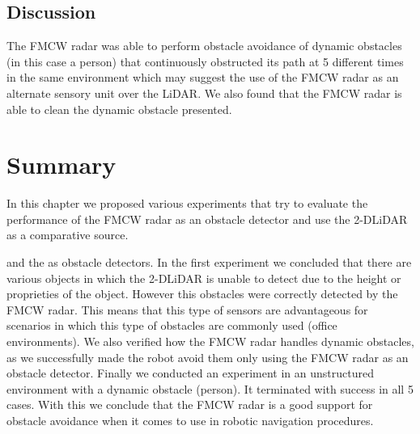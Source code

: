 \subsection{Discussion}
 The \ac{FMCW} radar was able to perform 
obstacle avoidance of dynamic obstacles (in this case a person) that continuously obstructed its path at 5 different times in the same environment which may suggest the use of the \ac{FMCW} \ac{radar} as an alternate sensory unit over the \ac{LiDAR}. We also found that the \ac{FMCW} \ac{radar} is able to clean the dynamic obstacle presented.

\section{Summary}
In this chapter we proposed various experiments that try to evaluate the performance of the \ac{FMCW} \ac{radar} as an obstacle detector and use the 2-D\ac{LiDAR} as a comparative source. 

and the  as obstacle detectors. In the first experiment we concluded that there are various objects in which the 2-D\ac{LiDAR} is unable to detect due to the height or proprieties of the object. However this obstacles were correctly detected by the \ac{FMCW} \ac{radar}. This means that this type of sensors  are advantageous for scenarios in which this type of obstacles are commonly used (office environments). We also verified how the FMCW radar handles dynamic obstacles, as we successfully made the robot avoid them only using the \ac{FMCW} \ac{radar} as an obstacle detector. Finally we conducted an experiment in an unstructured environment with a dynamic obstacle (person). It terminated with success in all 5 cases. With this we conclude that the \ac{FMCW} \ac{radar} is a good support for obstacle avoidance when it comes to use in robotic navigation procedures.

